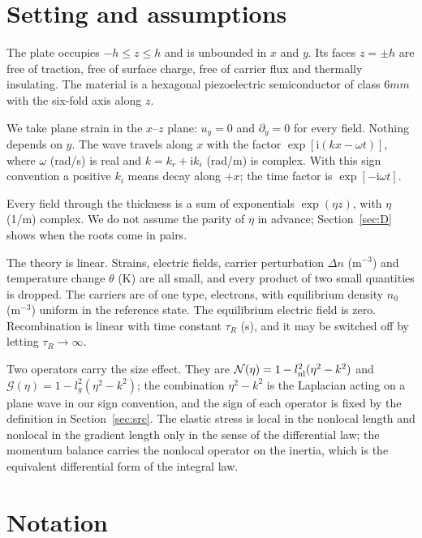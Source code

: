 \documentclass[11pt,a4paper]{article}
\newcommand{\Nc}{\mathcal{N}}
\newcommand{\Gc}{\mathcal{G}}
\newcommand{\ii}{\mathrm{i}}
\begin{document}
\section{Setting and assumptions}

The plate occupies $-h\le z\le h$ and is unbounded in $x$ and $y$. Its faces $z=\pm h$ are free of
traction, free of surface charge, free of carrier flux and thermally insulating. The material is a
hexagonal piezoelectric semiconductor of class $6mm$ with the six-fold axis along $z$.

We take plane strain in the $x$--$z$ plane: $u_y=0$ and $\partial_y=0$ for every field. Nothing depends on
$y$. The wave travels along $x$ with the factor $\exp[\ii(kx-\omega t)]$, where $\omega$ (rad/s) is real and
$k=k_r+\ii k_i$ (rad/m) is complex. With this sign convention a positive $k_i$ means decay along $+x$; the
time factor is $\exp[-\ii\omega t]$.

Every field through the thickness is a sum of exponentials $\exp(\eta z)$, with $\eta$ (1/m) complex. We do
not assume the parity of $\eta$ in advance; Section~\ref{sec:D} shows when the roots come in pairs.

The theory is linear. Strains, electric fields, carrier perturbation $\Delta n$ (m$^{-3}$) and temperature
change $\theta$ (K) are all small, and every product of two small quantities is dropped. The carriers are of
one type, electrons, with equilibrium density $n_0$ (m$^{-3}$) uniform in the reference state. The
equilibrium electric field is zero. Recombination is linear with time constant $\tau_R$ (s), and it may be
switched off by letting $\tau_R\to\infty$.

Two operators carry the size effect. They are $\Nc(\eta)=1-l_{\rm nl}^2(\eta^2-k^2)$ and
$\Gc(\eta)=1-l_g^2(\eta^2-k^2)$; the combination $\eta^2-k^2$ is the Laplacian acting on a plane wave in
our sign convention, and the sign of each operator is fixed by the definition in Section~\ref{sec:src}.
The elastic stress is local in the nonlocal length and nonlocal in the gradient length only in the sense of
the differential law; the momentum balance carries the nonlocal operator on the inertia, which is the
equivalent differential form of the integral law.

\section{Notation}\label{sec:not}
\end{document}

